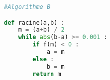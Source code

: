 \begin{lstlisting}[language=python]
#Algorithme B

def racine(a,b) :
	m = (a+b) / 2
	while abs(b-a) >= 0.001 :
		if f(m) < 0 :
			a = m
		else :
			b = m
		return m
\end{lstlisting}